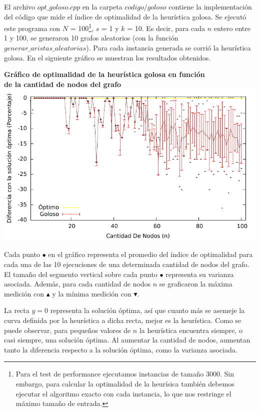 \par{El archivo $opt\_goloso.cpp$ en la carpeta $codigo/goloso$ contiene la
implementación del código que mide el índice de optimalidad de la heurística
golosa. Se ejecutó este programa con $N$ = 100\footnote{Para el test
de performance ejecutamos instancias de tamaño 3000. Sin embargo, para calcular
la optimalidad de la heurísica también debemos ejecutar el algoritmo exacto
con cada instancia, lo que nos restringe el máximo tamaño de entrada.},
$s$ = 1 y $k$ = 10. Es decir, para cada $n$ entero entre 1 y 100, se
generaron 10 grafos aleatorios (con la función $generar\_aristas\_aleatorias$).
Para cada instancia generada se corrió la heurística golosa.
En el siguiente gráfico se muestran los resultados obtenidos.}
\newpage
\begin{center}
\textbf{Gráfico de optimalidad de la heurística golosa en función\\de la cantidad
de nodos del grafo}
\includegraphics[scale=1.3]{imgs/opt_goloso_100_1_10.pdf}
\end{center}

\par{Cada punto $\bullet$ en el gráfico representa el promedio del índice de
optimalidad para cada una de las 10 ejecuciones de una determinada cantidad de
nodos del grafo. El tamaño del segmento vertical sobre cada punto $\bullet$
representa su varianza asociada. Además, para cada cantidad de nodos $n$ se
graficaron la máxima medición con $\blacktriangle$ y la mínima medición con
$\blacktriangledown$.}\\

\par{La recta $y=0$ representa la solución óptima, así que cuanto más se
asemeje la curva definida por la heurística a dicha recta, mejor es la
heurística. Como se puede observar, para pequeños valores de $n$ la heurística
encuentra siempre, o casi siempre, una solución óptima. Al aumentar la cantidad
de nodos, aumentan tanto la diferencia respecto a la solución óptima, como la
varianza asociada.}\\

